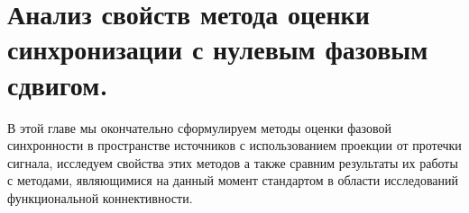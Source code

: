 \chapter{Анализ свойств метода оценки синхронизации с нулевым фазовым сдвигом.} \label{chapt3}
В этой главе мы окончательно сформулируем методы оценки
фазовой синхронности в пространстве источников с использованием
проекции от протечки сигнала, исследуем свойства этих методов
а также сравним результаты их работы с методами, являющимися на данный
момент стандартом в области исследований функциональной коннективности.


\clearpage
